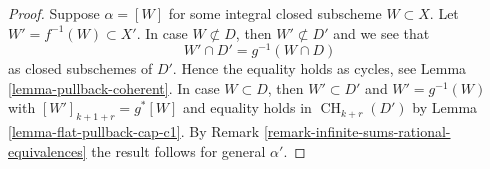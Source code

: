 \documentclass[10pt,a4paper]{amsart}
\theoremstyle{plain}
\theoremstyle{definition}
\theoremstyle{remark}
\numberwithin{equation}{subsection}
\def\CH{\mathop{\mathrm{CH}}\nolimits}
\begin{document}
\begin{proof}
Suppose $\alpha = [W]$ for some integral closed subscheme
$W \subset X$. Let $W' = f^{-1}(W) \subset X'$. In case $W \not \subset D$,
then $W' \not \subset D'$ and we see that
$$
W' \cap D' = g^{-1}(W \cap D)
$$
as closed subschemes of $D'$. Hence the
equality holds as cycles, see Lemma \ref{lemma-pullback-coherent}.
In case $W \subset D$, then $W' \subset D'$ and $W' = g^{-1}(W)$
with $[W']_{k + 1 + r} = g^*[W]$ and equality holds in
$\CH_{k + r}(D')$ by Lemma \ref{lemma-flat-pullback-cap-c1}.
By Remark \ref{remark-infinite-sums-rational-equivalences}
the result follows for general $\alpha'$.
\end{proof}
\end{document}
